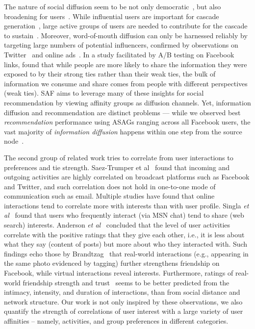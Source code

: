 The nature of social diffusion seem to be not only
democratic~\cite{asur2011trends,Bakshy2011everyone}, but also
broadening for users~\cite{Bakshy2012chamber}. While influential users
are important for cascade generation~\cite{Bakshy2011everyone}, large
active groups of users are needed to contribute for the cascade to
sustain~\cite{asur2011trends}. Moreover, word-of-mouth diffusion can
only be harnessed reliably by targeting large numbers of potential
influencers, confirmed by observations on
Twitter~\cite{Bakshy2011everyone} and online ads~\cite{influence}. In
a study facilitated by A/B testing on Facebook
links, \cite{Bakshy2012chamber} found that while people are more
likely to share the information they were exposed to by their strong
ties rather than their weak ties, the bulk of information we consume and
share comes from people with different perspectives (weak ties).  SAF
aims to leverage many of these insights for social recommendation by
viewing affinity groups as diffusion channels.  Yet, information diffusion
and recommendation are distinct problems --- while we observed
best \emph{recommendation} performance using ASAGs ranging across 
all Facebook users, the
vast majority of \emph{information diffusion} happens within one step
from the source node~\cite{Goel2012structure}.

The second group of related work tries to correlate from user
interactions to preferences and tie strength.  Saez-Trumper et
al~\cite{saez2011high} found that incoming and outgoing activities are
highly correlated on broadcast platforms such as Facebook and Twitter,
and such correlation does not hold in one-to-one mode of communication
such as email. Multiple studies have found that online interactions
tend to correlate more with interests than with user profile. Singla
{\it et al}~\cite{singla2008yes} found that users who frequently
interact (via MSN chat) tend to share (web search) interests.
Anderson {\it et al}~\cite{Anderson2012} concluded that the level of
user activities correlate with the positive ratings that they give
each other, i.e., it is less about what they say (content of posts)
but more about who they interacted with. Such findings echo those by
Brandtzag~\cite{brandtzag2011facebook} that real-world interactions
(e.g., appearing in the same photo evidenced by tagging) further
strengthens friendship on Facebook, while virtual interactions reveal
interests. Furthermore, ratings of real-world friendship strength and
trust~\cite{gilbert2009predicting} seems to be better predicted from
the intimacy, intensity, and duration of interactions, than from
social distance and network structure.  Our work is not only inspired
by these observations, we also quantify the strength of correlations
of user interest with a large variety of user affinities -- namely,
activities, and group preferences in different categories.

